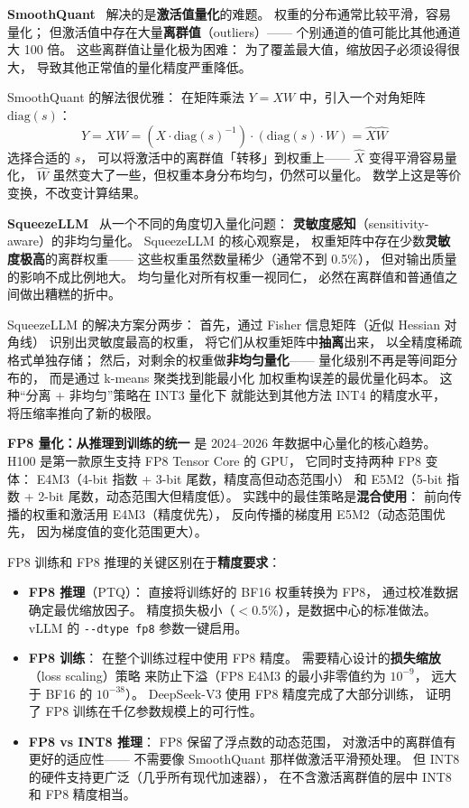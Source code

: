 \textbf{SmoothQuant}~\cite{xiao2023smoothquant} 解决的是\textbf{激活值量化}的难题。
权重的分布通常比较平滑，容易量化；
但激活值中存在大量\textbf{离群值}（outliers）——
个别通道的值可能比其他通道大 100 倍。
这些离群值让量化极为困难：
为了覆盖最大值，缩放因子必须设得很大，
导致其他正常值的量化精度严重降低。

SmoothQuant 的解法很优雅：
在矩阵乘法 $Y = XW$ 中，引入一个对角矩阵 $\mathrm{diag}(s)$：
\begin{equation}
  Y = XW = (X \cdot \mathrm{diag}(s)^{-1}) \cdot (\mathrm{diag}(s) \cdot W)
  = \hat{X} \hat{W}
\end{equation}
选择合适的 $s$，
可以将激活中的离群值「转移」到权重上——
$\hat{X}$ 变得平滑容易量化，
$\hat{W}$ 虽然变大了一些，但权重本身分布均匀，仍然可以量化。
数学上这是等价变换，不改变计算结果。

\textbf{SqueezeLLM}~\cite{kim2024squeezellm}
从一个不同的角度切入量化问题：
\textbf{灵敏度感知}（sensitivity-aware）的非均匀量化。
SqueezeLLM 的核心观察是，
权重矩阵中存在少数\textbf{灵敏度极高}的离群权重——
这些权重虽然数量稀少（通常不到 0.5\%），
但对输出质量的影响不成比例地大。
均匀量化对所有权重一视同仁，
必然在离群值和普通值之间做出糟糕的折中。

SqueezeLLM 的解决方案分两步：
首先，通过 Fisher 信息矩阵（近似 Hessian 对角线）
识别出灵敏度最高的权重，
将它们从权重矩阵中\textbf{抽离}出来，
以全精度稀疏格式单独存储；
然后，对剩余的权重做\textbf{非均匀量化}——
量化级别不再是等间距分布的，
而是通过 k-means 聚类找到能最小化
加权重构误差的最优量化码本。
这种``分离 + 非均匀''策略在 INT3 量化下
就能达到其他方法 INT4 的精度水平，
将压缩率推向了新的极限。

\textbf{FP8 量化：从推理到训练的统一}
是 2024--2026 年数据中心量化的核心趋势。
H100 是第一款原生支持 FP8 Tensor Core 的 GPU，
它同时支持两种 FP8 变体：
E4M3（4-bit 指数 + 3-bit 尾数，精度高但动态范围小）
和 E5M2（5-bit 指数 + 2-bit 尾数，动态范围大但精度低）。
实践中的最佳策略是\textbf{混合使用}：
前向传播的权重和激活用 E4M3（精度优先），
反向传播的梯度用 E5M2（动态范围优先，
因为梯度值的变化范围更大）。

FP8 训练和 FP8 推理的关键区别在于\textbf{精度要求}：
\begin{itemize}[noitemsep]
  \item \textbf{FP8 推理}（PTQ）：
        直接将训练好的 BF16 权重转换为 FP8，
        通过校准数据确定最优缩放因子。
        精度损失极小（$<$0.5\%），是数据中心的标准做法。
        vLLM 的 \texttt{-{}-dtype fp8} 参数一键启用。
  \item \textbf{FP8 训练}：
        在整个训练过程中使用 FP8 精度。
        需要精心设计的\textbf{损失缩放}（loss scaling）策略
        来防止下溢（FP8 E4M3 的最小非零值约为 $10^{-9}$，
        远大于 BF16 的 $10^{-38}$）。
        DeepSeek-V3 使用 FP8 精度完成了大部分训练，
        证明了 FP8 训练在千亿参数规模上的可行性。
  \item \textbf{FP8 vs INT8 推理}：
        FP8 保留了浮点数的动态范围，
        对激活中的离群值有更好的适应性——
        不需要像 SmoothQuant 那样做激活平滑预处理。
        但 INT8 的硬件支持更广泛（几乎所有现代加速器），
        在不含激活离群值的层中 INT8 和 FP8 精度相当。
\end{itemize}

